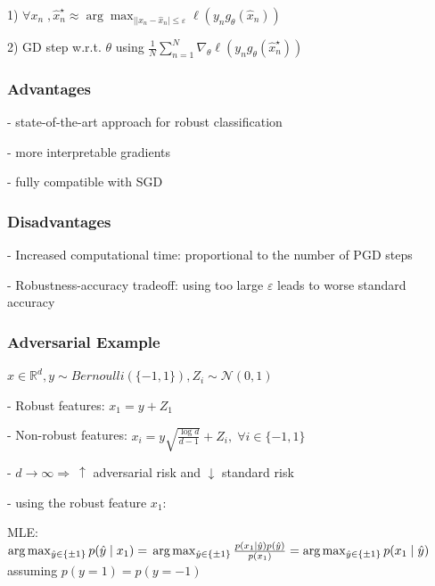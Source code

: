 1) $\forall x_n\;, \hat{x}_{n}^{\star}\approx\arg\operatorname*{max}_{||x_{n}-\hat{x}_{n}|\leq\varepsilon}\ell(y_{n}g_{\theta}(\hat{x}_{n}))$

2) GD step w.r.t. $\theta$ using $\frac{1}{N}\sum_{n=1}^{N}\nabla_{\theta}{\ell}(y_{n}g_{\theta}({\hat{x}}_{n}^{\star}))$

\subsubsection*{Advantages}

- state-of-the-art approach for robust classification

- more interpretable gradients

- fully compatible with SGD

\subsubsection*{Disadvantages}

- Increased computational time: proportional to the number of PGD steps

- Robustness-accuracy tradeoff: using too large $\varepsilon$ leads to worse standard accuracy

\subsubsection*{Adversarial Example}

$x\in\mathbb{R}^{d},y\sim{{Bernoulli}}(\{-1,1\}),Z_{i}\sim{\mathcal{N}}(0,1)$

- Robust features: $x_{1}=y+Z_{1}$

- Non-robust features: $x_{i}=y{\sqrt{\frac{\log d}{d-1}}}+Z_{i}, \; \forall i \in \{-1, 1\}$

- $d\to\infty \Rightarrow \ \uparrow$ adversarial risk and $\downarrow$ standard risk 

- using the robust feature $x_1$:

MLE: $\arg\operatorname*{max}_{\hat{y}\in\{\pm1\}}p(\hat{y}\;\vert\;x_{1})
=\\\operatorname*{arg}\operatorname*{max}_{{\hat{y}}\in\{\pm1\}}{\frac{p(x_{1}\mid{\hat{y}})p({\hat{y}})}{p(x_{1})}}
=\operatorname*{arg}\operatorname*{max}_{{\hat{y}}\in\{\pm1\}}{p(x_{1}\mid{\hat{y}})}$ 
assuming $p(y=1)=p(y=-1)$

